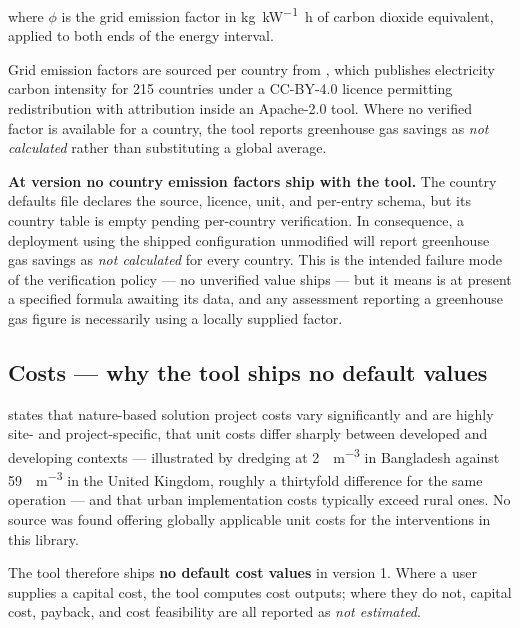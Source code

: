 where $\phi$ is the grid emission factor in
\unit{\kilo\gram\per\kilo\watt\hour} of carbon dioxide equivalent, applied to
both ends of the energy interval.

Grid emission factors are sourced per country from \textcite{ember}, which
publishes electricity carbon intensity for 215 countries under a CC-BY-4.0
licence permitting redistribution with attribution inside an Apache-2.0 tool.
Where no verified factor is available for a country, the tool reports
greenhouse gas savings as \emph{not calculated} rather than substituting a
global average.

\begin{keynote}
\noindent\textbf{At version \methver{} no country emission factors ship with
the tool.} The country defaults file declares the source, licence, unit, and
per-entry schema, but its country table is empty pending per-country
verification. In consequence, a deployment using the shipped configuration
unmodified will report greenhouse gas savings as \emph{not calculated} for
every country. This is the intended failure mode of the verification policy ---
no unverified value ships --- but it means  is at present a
specified formula awaiting its data, and any assessment reporting a greenhouse
gas figure is necessarily using a locally supplied factor.
\end{keynote}

\subsection{Costs --- why the tool ships no default values}
\label{sec:costs}

\textcite{worldbank2021} states that nature-based solution project costs vary
significantly and are highly site- and project-specific, that unit costs differ
sharply between developed and developing contexts --- illustrated by dredging
at \qty{2}{\USD\per\cubic\metre} in Bangladesh against
\qty{59}{\USD\per\cubic\metre} in the United Kingdom, roughly a thirtyfold
difference for the same operation --- and that urban implementation costs
typically exceed rural ones. No source was found offering globally applicable
unit costs for the interventions in this library.

The tool therefore ships \textbf{no default cost values} in version 1. Where a
user supplies a capital cost, the tool computes cost outputs; where they do
not, capital cost, payback, and cost feasibility are all reported as
\emph{not estimated}.

